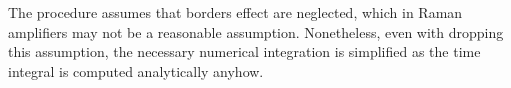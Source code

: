 \documentclass[10pt, lettersize, journal, onecolumn]{IEEEtran}
\begin{document}
The procedure assumes that borders effect are neglected, which in Raman amplifiers may not be a reasonable assumption.
Nonetheless, even with dropping this assumption, the necessary numerical integration is simplified as the time integral is computed analytically anyhow. 
\begin{comment}
Si noti come questa espressione sia molto simile con quella derivata tramite l'approssimazione di Papoulis \cite[eq. 10]{Dar_2013} (in questo caso abbiamo assunto $z_m \in [0, L]$).
Inoltre, mentre l'approssimazione originaria è valida solo a partire da una lunghezza di dispersione ($z_0 = \beta_2/T_0^2$), la (\ref{eq:solution}) è valida \textit{sempre} per impulsi gaussiani.

Quanto ottenuto nella (\ref{eq:solution}) fa sospettare che lo stesso risultato sarebbe stato ottenibile usando l'approssimazione in modo esatto. Infatti un aspetto fondamentale del ragionamento in \cite{Dar_2013} è che gli impulsi siano proporzionali e scalati rispetto ai loro \textit{spettri}. Questo per un impulso gaussiano è sempre vero. 

\vspace{20pt}
Verifichiamo se l'approssimazione vale in modo esatto: scriviamo i campi in dominio del tempo e della frequenza e confrontiamoli con la \cite[eq. 10]{Dar_2013}. Secondo l'Appendice 1, nel dominio del tempo abbiamo questa espressione equivalente
\begin{align}
	u(z, t) = U_0 \left(\dfrac{1+iD(z)}{1+D^2(z)}\right)^{\frac{1}{2}} \exp\left[-\dfrac{t^2}{2T_0^2} \dfrac{1+iD(z)}{1+D^2(z)}\right]
\end{align}
Mentre nel dominio della frequenza si ha (trasformata standard)
\begin{equation}
	\hat{u}(z, \omega) = U_0 T_0 \exp\left[-\dfrac{1}{2} \omega^2 (T_0^2 - i\beta_2z)\right]	
\end{equation}
ora si sostituisce $\omega \leftarrow \frac{t}{\beta_2z}$ e si ottiene 

\begin{align}
	\hat{u}(z, \omega) &= U_0 T_0 \exp\left[-\dfrac{t^2}{2\beta_2^2 z^2} (T_0^2 - i\beta_2z)\right]\\
	&= U_0 T_0 \exp\left[-\dfrac{t^2}{2T_0^2} \left(\dfrac{1}{D^2(z)} - i\dfrac{1}{D(z)}\right)\right] \\
	&= U_0 T_0 \exp\left[-\dfrac{t^2}{2T_0^2} \left(\dfrac{1-iD(z)}{D^2(z)}\right)\right] 
\end{align}
Osserviamo l'approssimazione
\begin{equation}
	u(z, t) \approx \sqrt{\frac{i}{2\pi \beta_2 z}} \underbrace{\exp\left[-i\frac{t^2}{2 \beta_2 z}\right] \hat{u}\left(0, \frac{t}{\beta_2 z}\right)}_{A}
\end{equation}
il termine contrassegnato da $A$ risulta
\begin{equation}
	A = U_0 T_0 \exp\left[-i\frac{t^2}{2 T_0^2} \dfrac{1}{D(z)}\right]\exp\left[-\dfrac{t^2}{2T_0^2} \left(\dfrac{1-iD(z)}{D^2(z)}\right)\right] = U_0 T_0 \exp\left[-\dfrac{t^2}{2T_0^2} \left(\dfrac{1}{D^2(z)}\right)\right]
\end{equation}


\end{comment}
\end{document}
